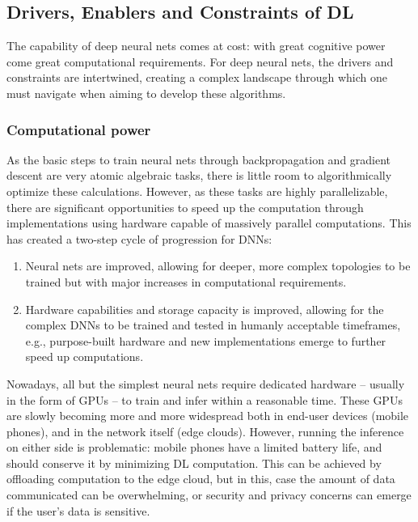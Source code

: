 		\subsection{Drivers, Enablers and Constraints of DL}
			\label{cha:deep_learning:sec:constraints}
			
			The capability of deep neural nets comes at cost: with great cognitive power come great computational requirements.
			For deep neural nets, the drivers and constraints are intertwined, creating a complex landscape through which one must navigate when aiming to develop these algorithms.
			
			\subsubsection*{Computational power}
			
				As the basic steps to train neural nets through backpropagation and gradient descent are very atomic algebraic tasks, there is little room to algorithmically optimize these calculations.
				However, as these tasks are highly parallelizable, there are significant opportunities to speed up the computation through implementations using hardware capable of massively parallel computations.
				This has created a two-step cycle of progression for \acp{DNN}:
				\begin{enumerate}[label=\textbf{\alph*})]
					\item Neural nets are improved, allowing for deeper, more complex topologies to be trained but with major increases in computational requirements.
					\item Hardware capabilities and storage capacity is improved, allowing for the complex \acp{DNN} to be trained and tested in humanly acceptable timeframes, e.g., purpose-built hardware and new implementations emerge to further speed up computations.				
				\end{enumerate}
				\noindent Nowadays, all but the simplest neural nets require dedicated hardware -- usually in the form of \acp{GPU} -- to train and infer within a reasonable time.
				These \acp{GPU} are slowly becoming more and more widespread both in end-user devices (mobile phones), and in the network itself (edge clouds).
				However, running the inference on either side is problematic: mobile phones have a limited battery life, and should conserve it by minimizing \ac{DL} computation.
				This can be achieved by offloading computation to the edge cloud, but in this, case the amount of data communicated can be overwhelming, or security and privacy concerns can emerge if the user's data is sensitive.
			
